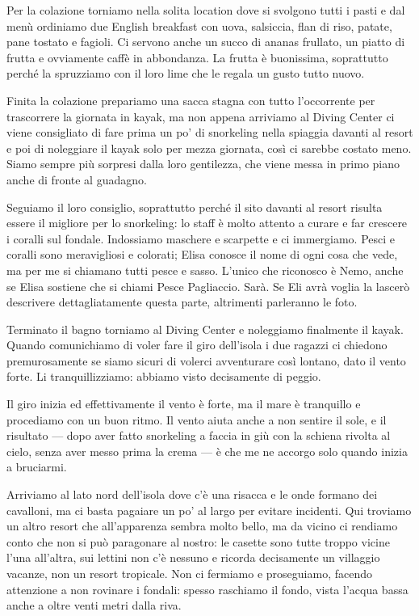 Per la colazione torniamo nella solita location dove si svolgono tutti i pasti e dal menù ordiniamo due English breakfast con uova, salsiccia, flan di riso, patate, pane tostato e fagioli. Ci servono anche un succo di ananas frullato, un piatto di frutta e ovviamente caffè in abbondanza. La frutta è buonissima, soprattutto perché la spruzziamo con il loro lime che le regala un gusto tutto nuovo.

Finita la colazione prepariamo una sacca stagna con tutto l'occorrente per trascorrere la giornata in kayak, ma non appena arriviamo al Diving Center ci viene consigliato di fare prima un po' di snorkeling nella spiaggia davanti al resort e poi di noleggiare il kayak solo per mezza giornata, così ci sarebbe costato meno. Siamo sempre più sorpresi dalla loro gentilezza, che viene messa in primo piano anche di fronte al guadagno.

Seguiamo il loro consiglio, soprattutto perché il sito davanti al resort risulta essere il migliore per lo snorkeling: lo staff è molto attento a curare e far crescere i coralli sul fondale. Indossiamo maschere e scarpette e ci immergiamo. Pesci e coralli sono meravigliosi e colorati; Elisa conosce il nome di ogni cosa che vede, ma per me si chiamano tutti pesce e sasso. L'unico che riconosco è Nemo, anche se Elisa sostiene che si chiami Pesce Pagliaccio. Sarà. Se Eli avrà voglia la lascerò descrivere dettagliatamente questa parte, altrimenti parleranno le foto.

Terminato il bagno torniamo al Diving Center e noleggiamo finalmente il kayak. Quando comunichiamo di voler fare il giro dell'isola i due ragazzi ci chiedono premurosamente se siamo sicuri di volerci avventurare così lontano, dato il vento forte. Li tranquillizziamo: abbiamo visto decisamente di peggio.

Il giro inizia ed effettivamente il vento è forte, ma il mare è tranquillo e procediamo con un buon ritmo. Il vento aiuta anche a non sentire il sole, e il risultato — dopo aver fatto snorkeling a faccia in giù con la schiena rivolta al cielo, senza aver messo prima la crema — è che me ne accorgo solo quando inizia a bruciarmi.

Arriviamo al lato nord dell'isola dove c'è una risacca e le onde formano dei cavalloni, ma ci basta pagaiare un po' al largo per evitare incidenti. Qui troviamo un altro resort che all'apparenza sembra molto bello, ma da vicino ci rendiamo conto che non si può paragonare al nostro: le casette sono tutte troppo vicine l'una all'altra, sui lettini non c'è nessuno e ricorda decisamente un villaggio vacanze, non un resort tropicale. Non ci fermiamo e proseguiamo, facendo attenzione a non rovinare i fondali: spesso raschiamo il fondo, vista l'acqua bassa anche a oltre venti metri dalla riva.


